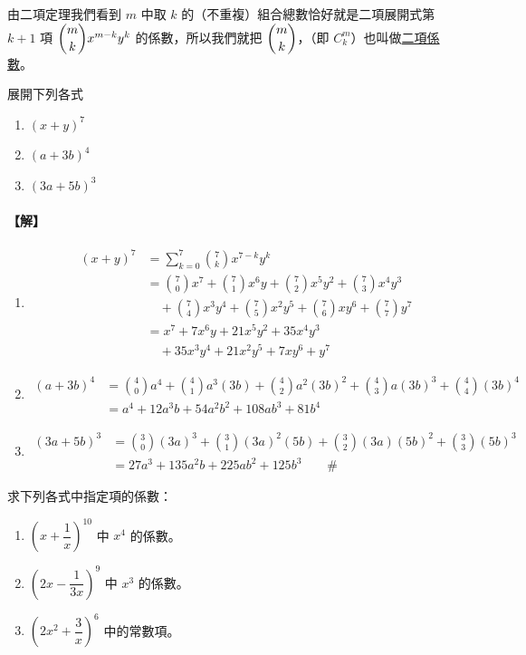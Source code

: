 由二項定理我們看到 $m$ 中取 $k$ 的（不重複）組合總數恰好就是二項展開式第 $k+1$ 項 $\dbinom{m}{k} x^{m-k} y^k$ 的係數，所以我們就把 $\dbinom{m}{k}$，（即 $C^m_k$）也叫做\underline{二項係數}。

\medskip
\begin{example}\label{ex:b5s-2-19}
展開下列各式
\begin{enumerate}[label=(\roman*)]
  \item $(x + y)^7$
  \item $(a + 3b)^4$
  \item $(3a + 5b)^3$
\end{enumerate}
\end{example}
\paragraph{【解】}
\begin{enumerate}[label=(\roman*)]
  \item \begin{align*}
  (x + y)^7 &= \sum_{k=0}^7 \binom{7}{k} x^{7-k} y^k \\
  &= \binom{7}{0} x^7 + \binom{7}{1} x^6 y + \binom{7}{2} x^5 y^2 + \binom{7}{3} x^4 y^3 \\
  &\quad + \binom{7}{4} x^3 y^4 + \binom{7}{5} x^2 y^5 + \binom{7}{6} x y^6 + \binom{7}{7} y^7 \\
  &= x^7 + 7x^6 y + 21x^5 y^2 + 35x^4 y^3 \\
  &\quad + 35x^3 y^4 + 21x^2 y^5 + 7xy^6 + y^7
  \end{align*}
  \item \begin{align*}
  (a + 3b)^4 &= \binom{4}{0} a^4 + \binom{4}{1} a^3 (3b) + \binom{4}{2} a^2 (3b)^2 + \binom{4}{3} a (3b)^3 + \binom{4}{4} (3b)^4 \\
  &= a^4 + 12a^3 b + 54a^2 b^2 + 108ab^3 + 81b^4
  \end{align*}
  \item \begin{align*}
  (3a + 5b)^3 &= \binom{3}{0} (3a)^3 + \binom{3}{1} (3a)^2 (5b) + \binom{3}{2} (3a)(5b)^2 + \binom{3}{3} (5b)^3 \\
  &= 27a^3 + 135a^2 b + 225ab^2 + 125b^3 \qquad \#
  \end{align*}
\end{enumerate}

\medskip
\begin{example}\label{ex:b5s-2-20}
求下列各式中指定項的係數：
\begin{enumerate}[label=(\roman*)]
  \item $\left(x + \dfrac{1}{x}\right)^{10}$ 中 $x^4$ 的係數。
  \item $\left(2x - \dfrac{1}{3x}\right)^9$ 中 $x^3$ 的係數。
  \item $\left(2x^2 + \dfrac{3}{x}\right)^6$ 中的常數項。
\end{enumerate}
\end{example}
